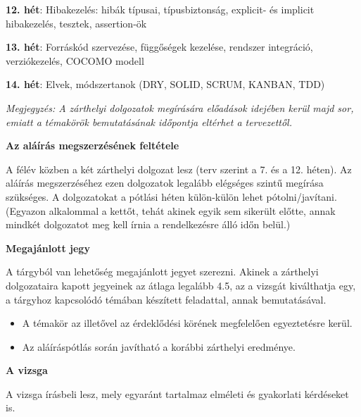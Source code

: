\documentclass[a4paper,12pt]{article}
\begin{document}
\bigskip

\noindent \textbf{12. hét}: Hibakezelés: hibák típusai, típusbiztonság, explicit- és implicit hibakezelés, tesztek, assertion-ök

\bigskip

\noindent \textbf{13. hét}: Forráskód szervezése, függőségek kezelése, rendszer integráció, verziókezelés, COCOMO modell

\bigskip

\noindent \textbf{14. hét}: Elvek, módszertanok (DRY, SOLID, SCRUM, KANBAN, TDD)

\vskip 1cm

\noindent \textit{Megjegyzés: A zárthelyi dolgozatok megírására előadások idejében kerül majd sor, emiatt a témakörök bemutatásának időpontja eltérhet a tervezettől.}

\newpage

\noindent \textbf{Az aláírás megszerzésének feltétele}

\smallskip

\noindent A félév közben a két zárthelyi dolgozat lesz (terv szerint a 7. és a 12. héten). Az aláírás megszerzéséhez ezen dolgozatok legalább elégséges szintű megírása szükséges. A dolgozatokat a pótlási héten külön-külön lehet pótolni/javítani. (Egyazon alkalommal a kettőt, tehát akinek egyik sem sikerült előtte, annak mindkét dolgozatot meg kell írnia a rendelkezésre álló időn belül.)

\vskip 1cm

\noindent \textbf{Megajánlott jegy}

\smallskip

\noindent A tárgyból van lehetőség megajánlott jegyet szerezni. Akinek a zárthelyi dolgozataira kapott jegyeinek az átlaga legalább 4.5, az a vizsgát kiválthatja egy, a tárgyhoz kapcsolódó témában készített feladattal, annak bemutatásával.
\begin{itemize}
	\item A témakör az illetővel az érdeklődési körének megfelelően egyeztetésre kerül.
	\item Az aláíráspótlás során javítható a korábbi zárthelyi eredménye.
\end{itemize}



\vskip 1cm

\noindent \textbf{A vizsga}

\smallskip

\noindent A vizsga írásbeli lesz, mely egyaránt tartalmaz elméleti és gyakorlati kérdéseket is.
\end{document}

